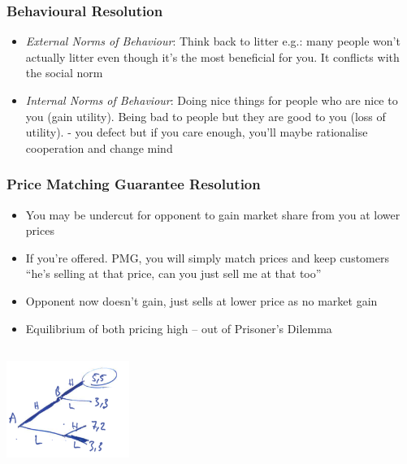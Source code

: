\documentclass[11pt, english]{article}
\begin{document}
		\subsubsection{Behavioural Resolution}
	
	\begin{itemize}
        \setlength\itemsep{0cm}
		\item \textit{External Norms of Behaviour}: Think back to litter e.g.: many people won’t actually litter even though it’s the most beneficial for you. It conflicts with the social norm
		\item \textit{Internal Norms of Behaviour}: Doing nice things for people who are nice to you (gain utility). Being bad to people but they are good to you (loss of utility). - you defect but if you care enough, you’ll maybe rationalise cooperation and change mind
	\end{itemize}

		\subsubsection{Price Matching Guarantee Resolution}

	\begin{itemize}                                         
        \setlength\itemsep{0cm}
		\item You may be undercut for opponent to gain market share from you at lower prices
		\item If you’re offered. PMG, you will simply match prices and keep customers ``he’s selling at that price, can you just sell me at that too''
		\item Opponent now doesn’t gain, just sells at lower price as no market gain
		\item Equilibrium of both pricing high – out of Prisoner’s Dilemma
	\end{itemize}

	\begin{center}
		\includegraphics[width=4cm,height=4cm]{EC315-IMG/10.png}
	\end{center}
\end{document}
